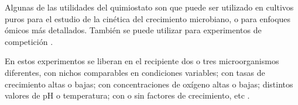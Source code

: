 Algunas de las utilidades del quimiostato son que puede ser utilizado en cultivos puros para el estudio de la cinética del crecimiento microbiano, o para enfoques ómicos más detallados. También se puede utilizar para experimentos de competición \citep{chemostat}.

En estos experimentos se liberan en el recipiente dos o tres microorganismos diferentes, con nichos comparables en condiciones variables; con tasas de crecimiento altas o bajas; con concentraciones de oxígeno altas o bajas; distintos valores de pH o temperatura; con o sin factores de crecimiento, etc \citep{chemostat}.

